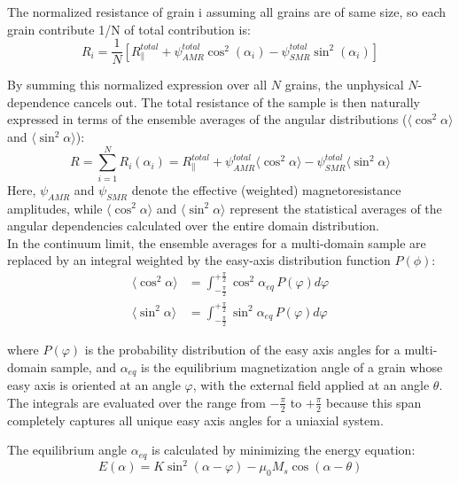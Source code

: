 \documentclass[11pt,a4paper]{article}
\begin{document}
The normalized resistance of grain i assuming all grains are of same size, so each grain contribute 1/N of total contribution is:
\begin{equation}
    R_i = \frac{1}{N} \left[ R_{\parallel}^{total} + \psi_{AMR}^{total}\cos^2(\alpha_i) - \psi_{SMR}^{total}\sin^2(\alpha_i) \right]
\end{equation}

By summing this normalized expression over all $N$ grains, the unphysical $N$-dependence cancels out. The total resistance of the sample is then naturally expressed in terms of the ensemble averages of the angular distributions ($\langle \cos^2 \alpha \rangle$ and $\langle \sin^2 \alpha \rangle$):
\begin{equation}
    R = \sum_{i=1}^N R_i(\alpha_i) = R_{\parallel}^{total} + \psi_{AMR}^{total} \langle \cos^2 \alpha \rangle - \psi_{SMR}^{total} \langle \sin^2 \alpha \rangle
\end{equation}
Here, $\psi_{AMR}$ and $\psi_{SMR}$ denote the effective (weighted) magnetoresistance amplitudes, while $\langle \cos^2\alpha \rangle$ and $\langle \sin^2\alpha \rangle$ represent the statistical averages of the angular dependencies calculated over the entire domain distribution.\\
In the continuum limit, the ensemble averages for a multi-domain sample are replaced by an integral weighted by the easy-axis distribution function $P(\phi)$:
\begin{align}
    \langle \cos^2\alpha \rangle &= \int_{-\frac{\pi}{2}}^{+\frac{\pi}{2}} \cos^2\alpha_{eq} \, P(\varphi)d\varphi \\
    \langle \sin^2\alpha \rangle &= \int_{-\frac{\pi}{2}}^{+\frac{\pi}{2}} \sin^2\alpha_{eq} \, P(\varphi)d\varphi
\end{align}

where $P(\varphi)$ is the probability distribution of the easy axis angles for a multi-domain sample, and $\alpha_{eq}$ is the equilibrium magnetization angle of a grain whose easy axis is oriented at an angle $\varphi$, with the external field applied at an angle $\theta$. The integrals are evaluated over the range from $-\frac{\pi}{2}$ to $+\frac{\pi}{2}$ because this span completely captures all unique easy axis angles for a uniaxial system. 

The equilibrium angle $\alpha_{eq}$ is calculated by minimizing the energy equation:
\begin{equation}
    E(\alpha) = K\sin^2(\alpha - \varphi) - \mu_0 M_s\cos(\alpha - \theta)
\end{equation}
\end{document}
